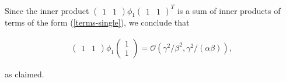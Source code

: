 Since the inner product $\begin{pmatrix} 1 & 1\end{pmatrix} \phi_1 \begin{pmatrix} 1 & 1\end{pmatrix}^T $ is a sum of inner products of terms of the form (\ref{terms-single}), we conclude that 

\begin{align} 
\begin{pmatrix} 1 & 1\end{pmatrix} \phi_1 \begin{pmatrix} 1 \\ 1\end{pmatrix} = \mathcal{O}(\gamma^2/\beta^2, \gamma^2/(\alpha\beta)),
\end{align}

as claimed. 







